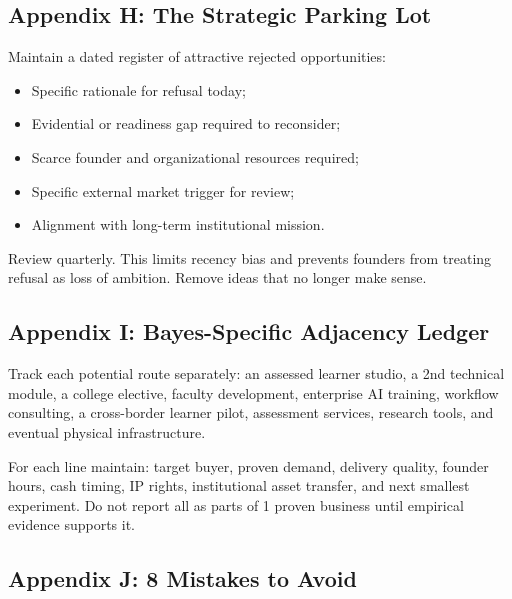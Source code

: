 \subsection*{Appendix H: The Strategic Parking Lot}
\label{sec:appendix_h_strategic_parking_lot}

Maintain a dated register of attractive rejected opportunities:
\begin{itemize}
    \item Specific rationale for refusal today;
    \item Evidential or readiness gap required to reconsider;
    \item Scarce founder and organizational resources required;
    \item Specific external market trigger for review;
    \item Alignment with long-term institutional mission.
\end{itemize}
Review quarterly. This limits recency bias and prevents founders from treating refusal as loss of ambition. Remove ideas that no longer make sense.

\subsection*{Appendix I: Bayes-Specific Adjacency Ledger}
\label{sec:appendix_i_bayes_adjacency_ledger}

Track each potential route separately: an assessed learner studio, a 2nd technical module, a college elective, faculty development, enterprise AI training, workflow consulting, a cross-border learner pilot, assessment services, research tools, and eventual physical infrastructure.

For each line maintain: target buyer, proven demand, delivery quality, founder hours, cash timing, IP rights, institutional asset transfer, and next smallest experiment. Do not report all as parts of 1 proven business until empirical evidence supports it.

\subsection*{Appendix J: 8 Mistakes to Avoid}
\label{sec:appendix_j_eight_mistakes_to_avoid}

